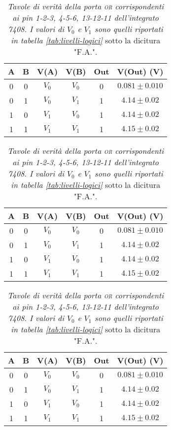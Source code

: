 \begin{table}[H]
  \centering
  \begin{tabular}[t]{c  c | c  c | c  c}
    \hline
    A & B & V(A) & V(B) & Out & V(Out) (V)\\
    \hline
    0 & 0 & $V_{0}$ & $V_{0}$ & 0 & $0.081 \pm 0.010$ \\
    0 & 1 & $V_{0}$ & $V_{1}$ & 1 & $4.14 \pm 0.02$ \\
    1 & 0 & $V_{1}$ & $V_{0}$ & 1 & $4.14 \pm 0.02$ \\
    1 & 1 & $V_{1}$ & $V_{1}$ & 1 & $4.15 \pm 0.02$ \\
    \hline
  \end{tabular}
  \vspace{.5mm}
  \begin{tabular}[t]{c  c | c  c | c  c}
    \hline
    A & B & V(A) & V(B) & Out & V(Out) (V)\\
    \hline
    0 & 0 & $V_{0}$ & $V_{0}$ & 0 & $0.081 \pm 0.010$ \\
    0 & 1 & $V_{0}$ & $V_{1}$ & 1 & $4.14 \pm 0.02$ \\
    1 & 0 & $V_{1}$ & $V_{0}$ & 1 & $4.14 \pm 0.02$ \\
    1 & 1 & $V_{1}$ & $V_{1}$ & 1 & $4.15 \pm 0.02$ \\
    \hline
  \end{tabular}
  \vspace{.5mm}
  \begin{tabular}[t]{c  c | c  c | c  c}
    \hline
    A & B & V(A) & V(B) & Out & V(Out) (V)\\
    \hline
    0 & 0 & $V_{0}$ & $V_{0}$ & 0 & $0.081 \pm 0.010$ \\
    0 & 1 & $V_{0}$ & $V_{1}$ & 1 & $4.14 \pm 0.02$ \\
    1 & 0 & $V_{1}$ & $V_{0}$ & 1 & $4.14 \pm 0.02$ \\
    1 & 1 & $V_{1}$ & $V_{1}$ & 1 & $4.15 \pm 0.02$ \\
    \hline
  \end{tabular}
  \caption{\emph{Tavole di verità della porta \textsc{or} corrispondenti ai pin 1-2-3, 4-5-6, 13-12-11 dell'integrato 7408. I valori di $V_{0}$ e $V_{1}$ sono quelli riportati in tabella \ref{tab:livelli-logici}} sotto la dicitura "F.A.".}
  \label{tab:or-multiplexer}
\end{table}

